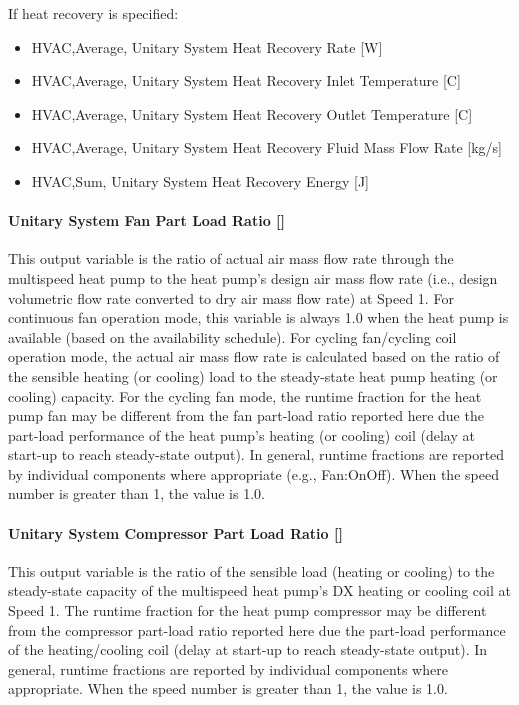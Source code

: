 If heat recovery is specified:

\begin{itemize}
\item
  HVAC,Average, Unitary System Heat Recovery Rate {[}W{]}
\item
  HVAC,Average, Unitary System Heat Recovery Inlet Temperature {[}C{]}
\item
  HVAC,Average, Unitary System Heat Recovery Outlet Temperature {[}C{]}
\item
  HVAC,Average, Unitary System Heat Recovery Fluid Mass Flow Rate {[}kg/s{]}
\item
  HVAC,Sum, Unitary System Heat Recovery Energy {[}J{]}
\end{itemize}

\paragraph{Unitary System Fan Part Load Ratio {[]}}\label{unitary-system-fan-part-load-ratio-4}

This output variable is the ratio of actual air mass flow rate through the multispeed heat pump to the heat pump's design air mass flow rate (i.e., design volumetric flow rate converted to dry air mass flow rate) at Speed 1. For continuous fan operation mode, this variable is always 1.0 when the heat pump is available (based on the availability schedule). For cycling fan/cycling coil operation mode, the actual air mass flow rate is calculated based on the ratio of the sensible heating (or cooling) load to the steady-state heat pump heating (or cooling) capacity. For the cycling fan mode, the runtime fraction for the heat pump fan may be different from the fan part-load ratio reported here due the part-load performance of the heat pump's heating (or cooling) coil (delay at start-up to reach steady-state output). In general, runtime fractions are reported by individual components where appropriate (e.g., Fan:OnOff). When the speed number is greater than 1, the value is 1.0.

\paragraph{Unitary System Compressor Part Load Ratio {[]}}\label{unitary-system-compressor-part-load-ratio-3}

This output variable is the ratio of the sensible load (heating or cooling) to the steady-state capacity of the multispeed heat pump's DX heating or cooling coil at Speed 1. The runtime fraction for the heat pump compressor may be different from the compressor part-load ratio reported here due the part-load performance of the heating/cooling coil (delay at start-up to reach steady-state output). In general, runtime fractions are reported by individual components where appropriate. When the speed number is greater than 1, the value is 1.0.

